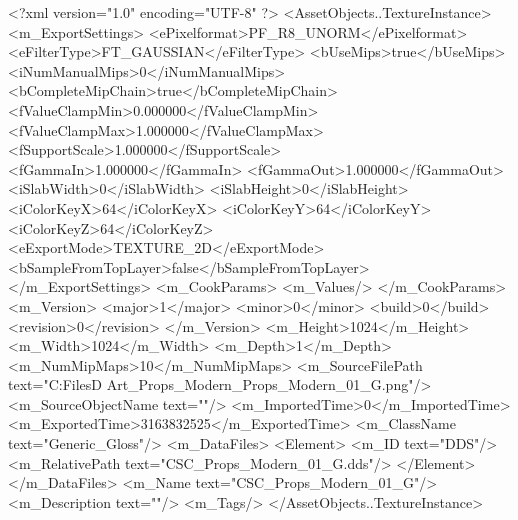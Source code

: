 <?xml version="1.0" encoding="UTF-8" ?>
<AssetObjects..TextureInstance>
	<m_ExportSettings>
		<ePixelformat>PF_R8_UNORM</ePixelformat>
		<eFilterType>FT_GAUSSIAN</eFilterType>
		<bUseMips>true</bUseMips>
		<iNumManualMips>0</iNumManualMips>
		<bCompleteMipChain>true</bCompleteMipChain>
		<fValueClampMin>0.000000</fValueClampMin>
		<fValueClampMax>1.000000</fValueClampMax>
		<fSupportScale>1.000000</fSupportScale>
		<fGammaIn>1.000000</fGammaIn>
		<fGammaOut>1.000000</fGammaOut>
		<iSlabWidth>0</iSlabWidth>
		<iSlabHeight>0</iSlabHeight>
		<iColorKeyX>64</iColorKeyX>
		<iColorKeyY>64</iColorKeyY>
		<iColorKeyZ>64</iColorKeyZ>
		<eExportMode>TEXTURE_2D</eExportMode>
		<bSampleFromTopLayer>false</bSampleFromTopLayer>
	</m_ExportSettings>
	<m_CookParams>
		<m_Values/>
	</m_CookParams>
	<m_Version>
		<major>1</major>
		<minor>0</minor>
		<build>0</build>
		<revision>0</revision>
	</m_Version>
	<m_Height>1024</m_Height>
	<m_Width>1024</m_Width>
	<m_Depth>1</m_Depth>
	<m_NumMipMaps>10</m_NumMipMaps>
	<m_SourceFilePath text="C:\Users\Shadow\Desktop\Working Files\3D Art\Textures\CSC_Props_Modern\Current\textures\CSC_Props_Modern_01_G.png"/>
	<m_SourceObjectName text=""/>
	<m_ImportedTime>0</m_ImportedTime>
	<m_ExportedTime>3163832525</m_ExportedTime>
	<m_ClassName text="Generic_Gloss"/>
	<m_DataFiles>
		<Element>
			<m_ID text="DDS"/>
			<m_RelativePath text="CSC_Props_Modern_01_G.dds"/>
		</Element>
	</m_DataFiles>
	<m_Name text="CSC_Props_Modern_01_G"/>
	<m_Description text=""/>
	<m_Tags/>
</AssetObjects..TextureInstance>

